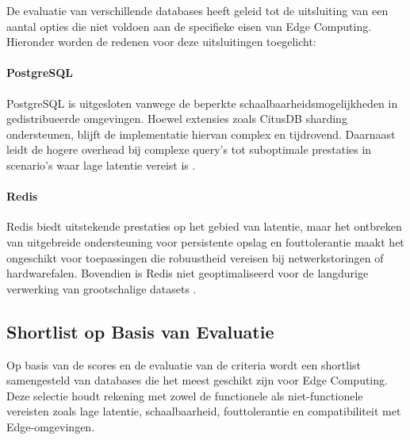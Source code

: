     De evaluatie van verschillende databases heeft geleid tot de uitsluiting van een aantal opties die niet voldoen aan de specifieke eisen van Edge Computing. Hieronder worden de redenen voor deze uitsluitingen toegelicht:

    \paragraph{PostgreSQL}
    PostgreSQL is uitgesloten vanwege de beperkte schaalbaarheidsmogelijkheden in gedistribueerde omgevingen. Hoewel extensies zoals CitusDB sharding ondersteunen, blijft de implementatie hiervan complex en tijdrovend. Daarnaast leidt de hogere overhead bij complexe query’s tot suboptimale prestaties in scenario’s waar lage latentie vereist is \autocite{PostgreSQLDocumentation, Kleppmann2017}.

    \paragraph{Redis}
    Redis biedt uitstekende prestaties op het gebied van latentie, maar het ontbreken van uitgebreide ondersteuning voor persistente opslag en fouttolerantie maakt het ongeschikt voor toepassingen die robuustheid vereisen bij netwerkstoringen of hardwarefalen. Bovendien is Redis niet geoptimaliseerd voor de langdurige verwerking van grootschalige datasets \autocite{RedisDocumentation, Mahmud2020}.

    \subsection{Shortlist op Basis van Evaluatie}
    Op basis van de scores en de evaluatie van de criteria wordt een shortlist samengesteld van databases die het meest geschikt zijn voor Edge Computing. Deze selectie houdt rekening met zowel de functionele als niet-functionele vereisten zoals lage latentie, schaalbaarheid, fouttolerantie en compatibiliteit met Edge-omgevingen.

